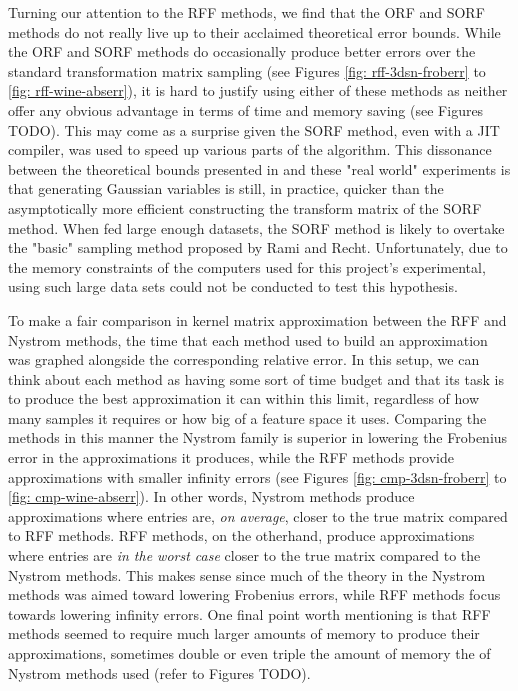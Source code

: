 Turning our attention to the RFF methods, we find that the ORF and SORF methods do not really live up to their acclaimed theoretical error bounds. While the ORF and SORF methods do occasionally produce better errors over the standard transformation matrix sampling (see Figures \ref{fig: rff-3dsn-froberr} to \ref{fig: rff-wine-abserr}), it is hard to justify using either of these methods as neither offer any obvious advantage in terms of time and memory saving (see Figures TODO). This may come as a surprise given the SORF method, even with a JIT compiler, was used to speed up various parts of the algorithm. This dissonance between the theoretical bounds presented in  and these "real world" experiments is that generating Gaussian variables is still, in practice, quicker than the asymptotically more efficient constructing the transform matrix of the SORF method. When fed large enough datasets, the SORF method is likely to overtake the "basic" sampling method proposed by Rami and Recht. Unfortunately, due to the memory constraints of the computers used for this project's experimental, using such large data sets could not be conducted to test this hypothesis.

To make a fair comparison in kernel matrix approximation between the RFF and Nystrom methods, the time that each method used to build an approximation was graphed alongside the corresponding relative error. In this setup, we can think about each method as having some sort of time budget and that its task is to produce the best approximation it can within this limit, regardless of how many samples it requires or how big of a feature space it uses. Comparing the methods in this manner the Nystrom family is superior in lowering the Frobenius error in the approximations it produces, while the RFF methods provide approximations with smaller infinity errors (see Figures \ref{fig: cmp-3dsn-froberr} to \ref{fig: cmp-wine-abserr}). In other words, Nystrom methods produce approximations where entries are, {\it on average}, closer to the true matrix compared to RFF methods. RFF methods, on the otherhand, produce approximations where entries are {\it in the worst case} closer to the true matrix compared to the Nystrom methods. This makes sense since much of the theory in the Nystrom methods was aimed toward lowering Frobenius errors, while RFF methods focus towards lowering infinity errors. One final point worth mentioning is that RFF methods seemed to require much larger amounts of memory to produce their approximations, sometimes double or even triple the amount of memory the of Nystrom methods used (refer to Figures TODO).

